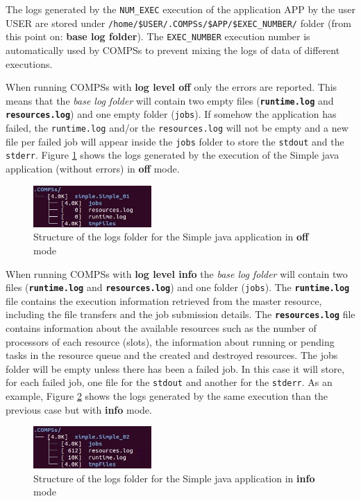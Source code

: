 The logs generated by the \texttt{NUM\_EXEC} execution of the application APP by the user USER are stored under
\texttt{/home/\$USER/.COMPSs/\$APP/\$EXEC\_NUMBER/} folder (from this point on: \textbf{base log folder}). The \texttt{EXEC\_NUMBER} execution number is 
automatically used by COMPSs to prevent mixing the logs of data of different executions. 

When running COMPSs with \textbf{log level off} only the errors are reported. This means that the \textit{base log folder} will 
contain two empty files (\texttt{\textbf{runtime.log}} and \texttt{\textbf{resources.log}}) and one empty folder (\texttt{jobs}). If somehow the 
application has failed, the \texttt{runtime.log} and/or the \texttt{resources.log} will not be empty and a new file per 
failed job will appear inside the \texttt{jobs} folder to store the \texttt{stdout} and the \texttt{stderr}. 
Figure \ref{fig:simple_log_off} shows the logs generated by the execution of the Simple java application (without errors) 
in \textbf{off} mode. 
\begin{figure}[h!]
  \centering
    \includegraphics[width=0.4\textwidth]{./Sections/3_Results_and_Logs/Figures/simple_log_off.jpeg}
    \caption{Structure of the logs folder for the Simple java application in \textbf{off} mode}
    \label{fig:simple_log_off}
\end{figure}

When running COMPSs with \textbf{log level info} the \textit{base log folder} will contain two files (\texttt{\textbf{runtime.log}} and 
\texttt{\textbf{resources.log}}) and one folder (\texttt{jobs}). The \texttt{\textbf{runtime.log}} file contains the execution information retrieved 
from the master resource, including the file transfers and the job submission details. The \texttt{\textbf{resources.log}} file contains 
information about the available resources such as the number of processors of each resource (slots), the information about running or 
pending tasks in the resource queue and the created and destroyed resources. The jobs folder will be empty unless there has been a
failed job. In this case it will store, for each failed job, one file for the \texttt{stdout} and another for the \texttt{stderr}.
As an example, Figure \ref{fig:simple_log_info} shows the logs generated by the same execution than the previous case 
but with \textbf{info} mode. 
\begin{figure}[h!]
  \centering
    \includegraphics[width=0.4\textwidth]{./Sections/3_Results_and_Logs/Figures/simple_log_info.jpeg}
    \caption{Structure of the logs folder for the Simple java application in \textbf{info} mode}
    \label{fig:simple_log_info}
\end{figure}


